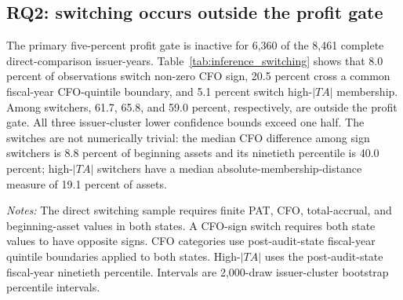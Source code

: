 \subsection{RQ2: switching occurs outside the profit gate}\label{subsec:results_switching}

The primary five-percent profit gate is inactive for 6,360 of the 8,461 complete direct-comparison issuer-years. Table~\ref{tab:inference_switching} shows that 8.0 percent of observations switch non-zero CFO sign, 20.5 percent cross a common fiscal-year CFO-quintile boundary, and 5.1 percent switch high-$|TA|$ membership. Among switchers, 61.7, 65.8, and 59.0 percent, respectively, are outside the profit gate. All three issuer-cluster lower confidence bounds exceed one half. The switches are not numerically trivial: the median CFO difference among sign switchers is 8.8 percent of beginning assets and its ninetieth percentile is 40.0 percent; high-$|TA|$ switchers have a median absolute-membership-distance measure of 19.1 percent of assets.

\begin{table}[htbp]
\centering
\caption{Direct reporting-state switching and profit-gate coverage}
\label{tab:inference_switching}
\scriptsize
{}
\begin{minipage}{0.97\textwidth}\footnotesize
\textit{Notes:} The direct switching sample requires finite PAT, CFO, total-accrual, and beginning-asset values in both states. A CFO-sign switch requires both state values to have opposite signs. CFO categories use post-audit-state fiscal-year quintile boundaries applied to both states. High-$|TA|$ uses the post-audit-state fiscal-year ninetieth percentile. Intervals are 2,000-draw issuer-cluster bootstrap percentile intervals.
\end{minipage}
\end{table}

